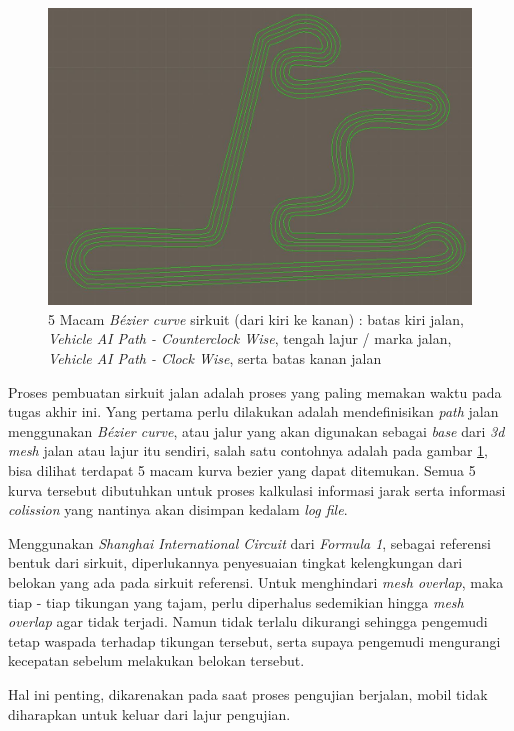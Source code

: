 	\begin{figure} [!htb]
	    \captionsetup{justification=centering}
	    \includegraphics[scale=0.36]{img/bezier-curve-jalan.JPG}
	    \caption{5 Macam \textit{Bézier curve} sirkuit (dari kiri ke kanan) : batas kiri jalan, \textit{Vehicle AI Path - Counterclock Wise}, tengah lajur / marka jalan, \textit{Vehicle AI Path - Clock Wise}, serta batas kanan jalan }
	    \label{fig: 3_9}
    \end{figure}
	
	Proses pembuatan sirkuit jalan adalah proses yang paling memakan waktu pada tugas akhir ini. Yang pertama perlu dilakukan adalah mendefinisikan \textit{path} jalan menggunakan \textit{Bézier curve}, atau jalur yang akan digunakan sebagai \textit{base} dari \textit{3d mesh} jalan atau lajur itu sendiri, salah satu contohnya adalah pada gambar \ref{fig: 3_9}, bisa dilihat terdapat 5 macam kurva bezier yang dapat ditemukan. Semua 5 kurva tersebut dibutuhkan untuk proses kalkulasi informasi jarak serta informasi \textit{colission} yang nantinya akan disimpan kedalam \textit{log file}.
	\par Menggunakan \textit{Shanghai International Circuit} dari \textit{Formula 1}, sebagai referensi bentuk dari sirkuit, diperlukannya penyesuaian tingkat kelengkungan dari belokan yang ada pada sirkuit referensi. Untuk menghindari \textit{mesh overlap}, maka tiap - tiap tikungan yang tajam, perlu diperhalus sedemikian hingga \textit{mesh overlap} agar tidak terjadi. Namun tidak terlalu dikurangi sehingga pengemudi tetap waspada terhadap tikungan tersebut, serta supaya pengemudi mengurangi kecepatan sebelum melakukan belokan tersebut.
	\par Hal ini penting, dikarenakan pada saat proses pengujian berjalan, mobil tidak diharapkan untuk keluar dari lajur pengujian.
	    
